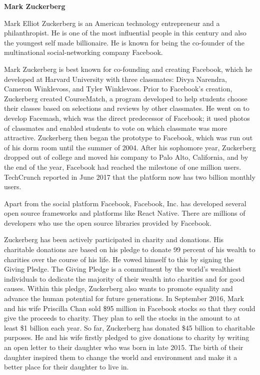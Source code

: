 \documentclass [12pt, a4paper]{article}
\begin{document}
\normalsize
\begin{center}
	\textbf{Mark Zuckerberg}
\end{center}

Mark Elliot Zuckerberg is an American technology entrepreneur and a philanthropist. He is one of the most influential people in this century and also the youngest self made billionaire. He is known for being the co-founder of the multinational social-networking company Facebook.\\
\par
Mark Zuckerberg is best known for co-founding and creating Facebook, which he developed at Harvard University with three classmates: Divya Narendra, Cameron Winklevoss, and Tyler Winklevoss. Prior to Facebook’s creation, Zuckerberg created CourseMatch, a program developed to help students choose their classes based on selections and reviews by other classmates. He went on to develop Facemash, which was the direct predecessor of Facebook; it used photos of classmates and enabled students to vote on which classmate was more attractive. Zuckerberg then began the prototype to Facebook, which was run out of his dorm room until the summer of 2004. After his sophomore year, Zuckerberg dropped out of college and moved his company to Palo Alto, California, and by the end of the year, Facebook had reached the milestone of one million users. TechCrunch reported in June 2017 that the platform now has two billion monthly users.\\
\par
Apart from the social platform Facebook, Facebook, Inc. has developed several open source frameworks and platforms like React Native. There are millions of developers who use the open source libraries provided by Facebook.\\
\par
Zuckerberg has been actively participated in charity and donations. His charitable donations are based on his pledge to donate 99 percent of his wealth to charities over the course of his life. He vowed himself to this by signing the Giving Pledge. The Giving Pledge is a commitment by the world’s wealthiest individuals to dedicate the majority of their wealth into charities and for good causes. Within this pledge, Zuckerberg also wants to promote equality and advance the human potential for future generations. In September 2016, Mark and his wife Priscilla Chan sold \$95 million in Facebook stocks so that they could give the proceeds to charity. They plan to sell the stocks in the amount to at least \$1 billion each year. So far, Zuckerberg has donated \$45 billion to charitable purposes. He and his wife firstly pledged to give donations to charity by writing an open letter to their daughter who was born in late 2015. The birth of their daughter inspired them to change the world and environment and make it a better place for their daughter to live in.\\
\end{document}
